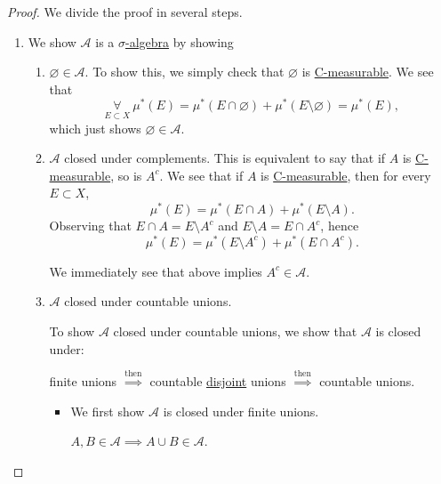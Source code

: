 \begin{proof}\let\qed\relax
	We divide the proof in several steps.
	\begin{enumerate}
		\item We show \(\mathcal{A}\) is a \hyperref[def:sigma-algebra]{\(\sigma\)-algebra} by showing
		      \begin{enumerate}
			      \item \(\varnothing \in \mathcal{A} \). To show this, we simply check that \(\varnothing \) is \hyperref[def:C-measurable]{C-measurable}. We see that
			            \[
				            \underset{E\subset X}{\forall}\ \mu^{*} (E) = \mu^{*} (E\cap \varnothing ) + \mu^{*} (E \setminus \varnothing ) = \mu^{*} (E),
			            \]
			            which just shows \(\varnothing \in \mathcal{A}\).
			      \item \(\mathcal{A} \) closed under complements. This is equivalent to say that if \(A\) is \hyperref[def:C-measurable]{C-measurable}, so is \(A^{c}\).
			            We see that if \(A\) is \hyperref[def:C-measurable]{C-measurable}, then for every \(E\subset X\),
			            \[
				            \mu^{*} (E) = \mu^{*} (E\cap A) + \mu^{*} (E\setminus A).
			            \]
			            Observing that \(E\cap A = E\setminus A^{c} \) and \(E\setminus A = E\cap A^{c} \), hence
			            \[
				            \mu^{*} (E) = \mu^{*} (E\setminus A^{c} ) + \mu^{*} (E\cap A^{c} ).
			            \]
			            \par We immediately see that above implies \(A^{c} \in\mathcal{A} \).
			      \item \(\mathcal{A} \) closed under countable unions.
			            \begin{note}
				            To show \(\mathcal{A} \) closed under countable unions, we show that \(\mathcal{A}\) is closed under:
				            \begin{center}
					            finite unions \(\overset{\text{then}}{\implies}\) countable \underline{disjoint} unions \(\overset{\text{then}}{\implies}\) countable unions.
				            \end{center}
			            \end{note}
			            \begin{itemize}
				            \item We first show \(\mathcal{A} \) is closed under finite unions.
				                  \begin{claim}\label{pf:Caratheodory-extension-Thm-1-finite-unions}
					                  \(A, B\in \mathcal{A} \implies A\cup B\in \mathcal{A}\).

\end{claim}
\end{itemize}
\end{enumerate}
\end{enumerate}
\end{proof}
